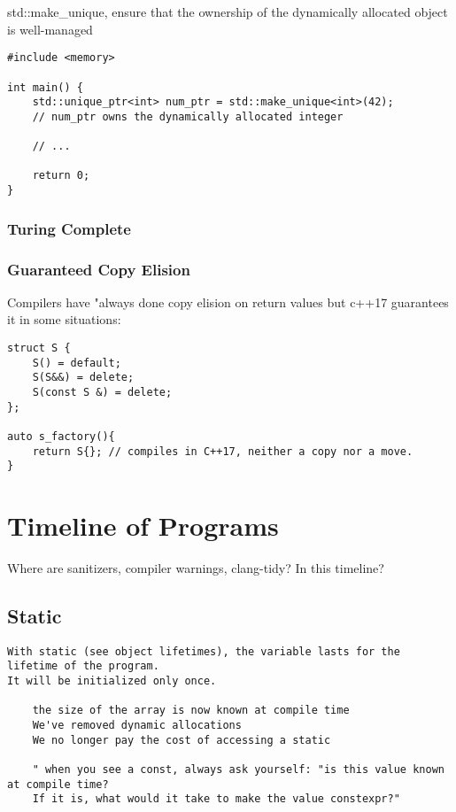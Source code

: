 std::make\_unique, ensure that the ownership of the dynamically allocated object is well-managed 


\begin{verbatim}
#include <memory>

int main() {
    std::unique_ptr<int> num_ptr = std::make_unique<int>(42);
    // num_ptr owns the dynamically allocated integer

    // ...
    
    return 0;
}
\end{verbatim}


\subsection{Turing Complete}


\subsection{Guaranteed Copy Elision}

Compilers have "always done copy elision on return values but c++17 guarantees it in some situations:

\begin{verbatim}
struct S {
    S() = default;
    S(S&&) = delete;
    S(const S &) = delete;
};

auto s_factory(){
    return S{}; // compiles in C++17, neither a copy nor a move.
}
\end{verbatim}

\chapter{Timeline of Programs}

Where are sanitizers, compiler warnings, clang-tidy? In this timeline?

\section{Static}

\begin{verbatim}
With static (see object lifetimes), the variable lasts for the lifetime of the program.
It will be initialized only once. 

    the size of the array is now known at compile time
    We've removed dynamic allocations
    We no longer pay the cost of accessing a static

    " when you see a const, always ask yourself: "is this value known at compile time? 
    If it is, what would it take to make the value constexpr?" 
\end{verbatim}

